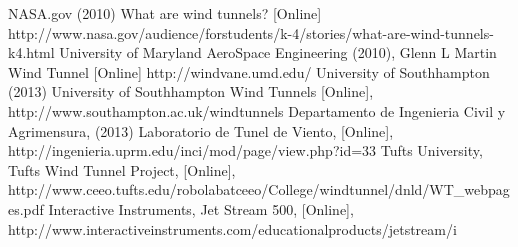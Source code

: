 \begin{thebibliography}{99}
		NASA.gov (2010) What are wind tunnels? [Online] http://www.nasa.gov/audience/forstudents/k-4/stories/what-are-wind-tunnels-k4.html
		University of Maryland AeroSpace Engineering (2010), Glenn L Martin Wind Tunnel [Online] http://windvane.umd.edu/
		University of Southhampton (2013) University of Southhampton Wind Tunnels [Online], http://www.southampton.ac.uk/windtunnels
		Departamento de Ingenieria Civil y Agrimensura, (2013) Laboratorio de Tunel de Viento, [Online], http://ingenieria.uprm.edu/inci/mod/page/view.php?id=33
		Tufts University, Tufts Wind Tunnel Project, [Online], http://www.ceeo.tufts.edu/robolabatceeo/College/windtunnel/dnld/WT\_webpages.pdf
		Interactive Instruments, Jet Stream 500, [Online], http://www.interactiveinstruments.com/educationalproducts/jetstream/i
\end{thebibliography}